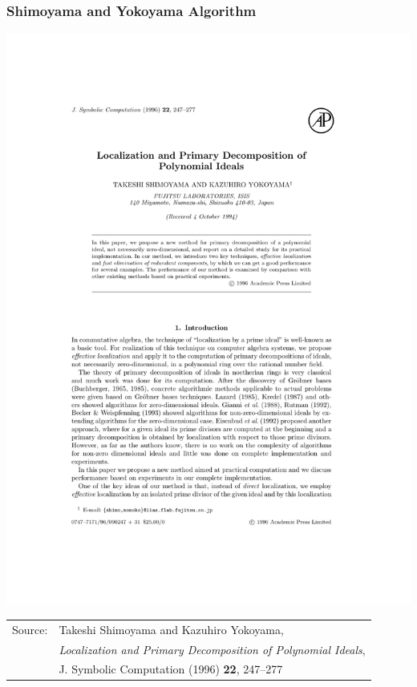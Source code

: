 \documentclass{beamer}
\begin{document}
\begin{frame}
\frametitle{Shimoyama and Yokoyama Algorithm}
\includegraphics[page=9, clip, trim=1.3in 4in 0in 5.1in, scale=0.9]{1-s2.0-S0747717196900528-main.pdf}

\vfill
\small
\begin{tabular}{ll}
Source: & Takeshi Shimoyama and Kazuhiro Yokoyama, \\
        & {\it Localization and Primary Decomposition of Polynomial Ideals}, \\
        & J. Symbolic Computation (1996) {\bf 22}, 247–277 \\
\end{tabular}
\end{frame}
\end{document}
